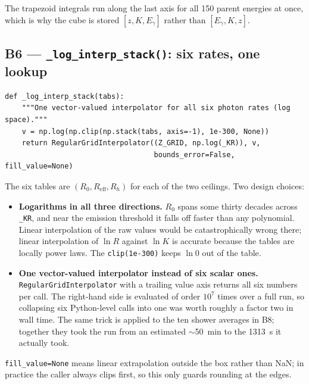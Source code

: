 \documentclass[11pt,a4paper]{article}
\newcommand{\code}[1]{\texttt{\small #1}}
\newcommand{\Eg}{E_\gamma}
\begin{document}
The trapezoid integrals run along the last axis for all 150 parent energies at
once, which is why the cube is stored $[z,K,\Eg]$ rather than $[\Eg,K,z]$.

\subsection*{B6 --- \code{\_log\_interp\_stack()}: six rates, one lookup}

\begin{lstlisting}
def _log_interp_stack(tabs):
    """One vector-valued interpolator for all six photon rates (log space)."""
    v = np.log(np.clip(np.stack(tabs, axis=-1), 1e-300, None))
    return RegularGridInterpolator((Z_GRID, np.log(_KR)), v,
                                   bounds_error=False, fill_value=None)
\end{lstlisting}

The six tables are $(R_0,R_{\mathrm{eff}},R_h)$ for each of the two ceilings.
Two design choices:

\begin{itemize}[leftmargin=1.3em]
\item \textbf{Logarithms in all three directions.}  $R_0$ spans some thirty
      decades across \code{\_KR}, and near the emission threshold it falls off
      faster than any polynomial.  Linear interpolation of the raw values would
      be catastrophically wrong there; linear interpolation of $\ln R$ against
      $\ln K$ is accurate because the tables are locally power laws.  The
      \code{clip(1e-300)} keeps $\ln 0$ out of the table.
\item \textbf{One vector-valued interpolator instead of six scalar ones.}
      \code{RegularGridInterpolator} with a trailing value axis returns all six
      numbers per call.  The right-hand side is evaluated of order $10^7$ times
      over a full run, so collapsing six Python-level calls into one was worth
      roughly a factor two in wall time.  The same trick is applied to the ten
      shower averages in B8; together they took the run from an estimated
      $\sim$50~min to the 1313~s it actually took.
\end{itemize}

\code{fill\_value=None} means linear extrapolation outside the box rather than
NaN; in practice the caller always clips first, so this only guards rounding at
the edges.
\end{document}
